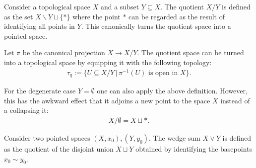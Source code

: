     \begin{construct}\label{topology:quotient_space}
        Consider a topological space $X$ and a subset $Y\subseteq X$. The quotient $X/Y$ is defined as the set $X\backslash Y\sqcup\{\ast\}$ where the point $\ast$ can be regarded as the result of identifying all points in $Y$. This canonically turns the quotient space into a pointed space.

        Let $\pi$ be the canonical projection $X\rightarrow X/Y$. The quotient space can be turned into a topological space by equipping it with the following topology:
        \begin{gather}
            \tau_q := \big\{U\subseteq X/Y\,\big\vert\,\pi^{-1}(U)\text{ is open in }X\big\}.
        \end{gather}
    \end{construct}
    \begin{remark}
        For the degenerate case $Y=\emptyset$ one can also apply the above definition. However, this has the awkward effect that it adjoins a new point to the space $X$ instead of a collapsing it:
        \begin{gather}
            \label{topology:empty_quotient}
            X/\emptyset = X\sqcup\ast.
        \end{gather}
    \end{remark}

    \begin{construct}
        Consider two pointed spaces $(X,x_0),(Y,y_0)$. The wedge sum $X\vee Y$ is defined as the quotient of the disjoint union $X\sqcup Y$ obtained by identifying the basepoints $x_0\sim y_0$.
    \end{construct}

